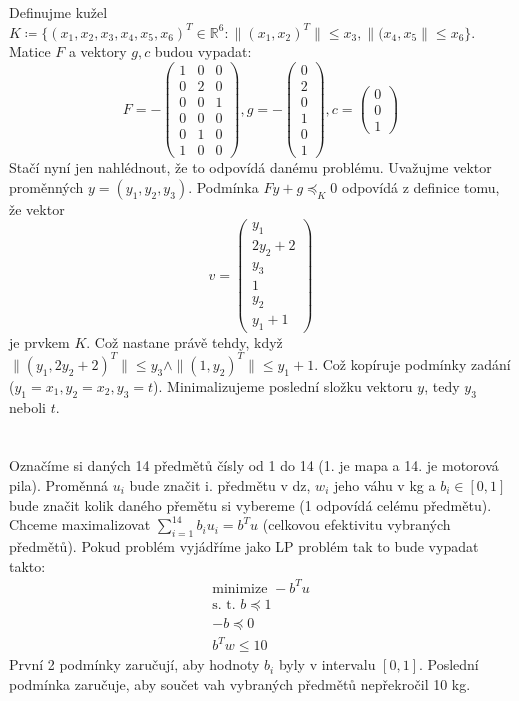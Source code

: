\documentclass[12pt, a4paper]{article}
\begin{document}
\section{}
Definujme kužel $K \coloneqq \{(x_1,x_2,x_3,x_4,x_5,x_6)^T \in \mathbb{R}^6: \|(x_1,x_2)^T\| \leq x_3, \|(x_4,x_5\| \leq x_6\}$. Matice $F$ a vektory $g, c$ budou vypadat:
\[
F = -\begin{pmatrix}
1 & 0 & 0 \\
0 & 2 & 0 \\
0 & 0 & 1 \\
0 & 0 & 0 \\
0 & 1 & 0 \\
1 & 0 & 0
\end{pmatrix},
g = -\begin{pmatrix}
0 \\
2 \\
0 \\
1 \\
0 \\
1
\end{pmatrix},
c = \begin{pmatrix}
0\\
0\\
1
\end{pmatrix}
\]
Stačí nyní jen nahlédnout, že to odpovídá danému problému. Uvažujme vektor proměnných $y = (y_1, y_2, y_3)$. Podmínka $Fy+g \preceq_K 0$ odpovídá z definice tomu, že vektor
\[
v = \begin{pmatrix}
y_1 \\
2y_2 + 2\\
y_3\\
1\\
y_2\\
y_1+1
\end{pmatrix}
\]
je prvkem $K$. Což nastane právě tehdy, když $\|(y_1,2y_2+2)^T\|\leq y_3 \land \|(1,y_2)^T\| \leq y_1+1$. Což kopíruje podmínky zadání ($y_1 = x_1, y_2 = x_2, y_3 = t$). Minimalizujeme poslední složku vektoru $y$, tedy $y_3$ neboli $t$.
\section{}
Označíme si daných 14 předmětů čísly od 1 do 14 (1. je mapa a 14. je motorová pila). Proměnná $u_i$ bude značit  i. předmětu v dz, $w_i$ jeho váhu v kg a $b_i \in [0,1]$ bude značit kolik daného přemětu si vybereme (1 odpovídá celému předmětu). Chceme maximalizovat $\sum_{i=1}^{14} b_i u_i = b^T u$ (celkovou efektivitu vybraných předmětů). Pokud problém vyjádříme jako LP problém tak to bude vypadat takto:
\begin{gather*}
\text{minimize } -b^T u\\
\text{s. t. } b \preceq 1\\
-b \preceq 0\\
b^T w \leq 10
\end{gather*}
První 2 podmínky zaručují, aby hodnoty $b_i$ byly v intervalu $[0,1]$. Poslední podmínka zaručuje, aby součet vah vybraných předmětů nepřekročil 10 kg.
\end{document}
